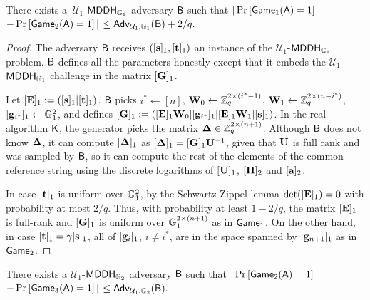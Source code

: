 \begin{lemma} There exists a~$\mathcal{U}_1$-$\mathsf{MDDH}_{\mathbb{G}_1}$ adversary $\mathsf{B}$ such that
$|\Pr\left[\mathsf{Game}_{1}(\mathsf{A})=1\right]$ $-\Pr\left[\mathsf{Game}_{2}(\mathsf{A})=1\right]|$ $\leq
    \mathsf{Adv}_{\mathcal{U}_1,\mathbb{G}_1}(\mathsf{B}) + 2/q.$
\label{lemma:bits2}
\end{lemma}
\begin{proof}
The adversary $\mathsf{B}$ receives $([\mathbf{s}]_1, [\mathbf{t}]_1)$ an instance of the $\mathcal{U}_1$-$\mathsf{MDDH}_{\mathbb{G}_1}$ problem.
$\mathsf{B}$ defines all the parameters honestly except that
it embeds the $\mathcal{U}_1$-$\mathsf{MDDH}_{\mathbb{G}_1}$ challenge in the matrix 
$[\mathbf{{G}}]_1$.

Let $[\mathbf{{E}}]_1:=([\mathbf{s}]_1|[\mathbf{t}]_1)$. $\mathsf{B}$ picks $i^*\gets[n]$, $\mathbf{{W}}_0\gets\mathbb{Z}_q^{2\times(i^*-1)}$,
$\mathbf{{W}}_1\gets\mathbb{Z}_q^{2\times(n-i^*)}$,
$[\mathbf{g}_{i^*}]_1\gets\mathbb{G}_1^{2}$,
and defines $[\mathbf{{G}}]_1 := ([\mathbf{{E}}]_1\mathbf{{W}}_0|[\mathbf{g}_{i^*}]_1|[\mathbf{{E}}]_1\mathbf{{W}}_1| [\mathbf{s}]_1)$. 
In the real algorithm $\mathsf{K}$, the generator picks the matrix $\mathbf{{\Delta}} \in \mathbb{Z}_q^{2 \times (n+1)}$.
Although $\mathsf{B}$ does not know $\mathbf{{\Delta}}$,  it can compute $[\mathbf{{\Delta}}]_1$ as $[\mathbf{{\Delta}}]_1= [\mathbf{{G}}]_1\mathbf{{U}}^{-1}$,
given that $\mathbf{{U}}$ is full rank and was  sampled 
by $\mathsf{B}$, so it can compute the rest of the elements of the
common reference string  using the discrete logarithms of $[\mathbf{{U}}]_1$, $[{\mathbf{{H}}}]_2$ and $[\mathbf{a}]_2$.  

In case $[\mathbf{t}]_1$ is uniform over $\mathbb{G}_1^{2}$, by the Schwartz-Zippel lemma $\det([\mathbf{{E}}]_1) = 0$ with probability at most $2/q$.
Thus, with probability at least $1-2/q$, the matrix $[\mathbf{{E}}]_1$ is full-rank and $[\mathbf{{G}}]_1$ is uniform over $\mathbb{G}_1^{2\times(n+1)}$ as in
$\mathsf{Game}_1$.
On the other hand, in case $[\mathbf{t}]_1=\gamma [\mathbf{s}]_1$, all of $[\mathbf{g}_{i}]_1$, $i\neq i^*$, are in the space
spanned by $[\mathbf{g}_{n+1}]_1$ as in $\mathsf{Game}_2$.
\end{proof}

\begin{lemma} There exists a $\mathcal{U}_1$-$\mathsf{MDDH}_{\mathbb{G}_2}$ adversary $\mathsf{B}$ such that
$|\Pr\left[\mathsf{Game}_{2}(\mathsf{A})=1\right]$ $-\Pr\left[\mathsf{Game}_{3}(\mathsf{A})=1\right]|$ $\leq
\mathsf{Adv}_{\mathcal{U}_1,\mathbb{G}_2}(\mathsf{B}).$
\label{lemma:bits3}
\end{lemma}

